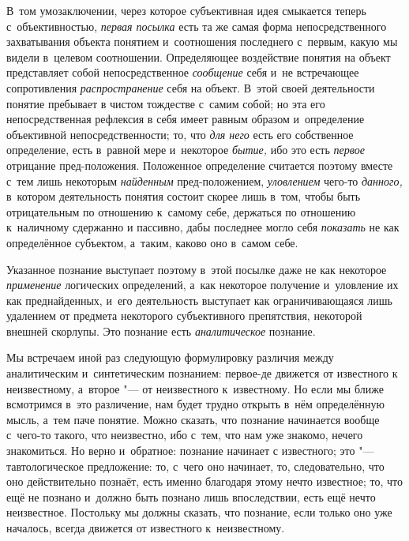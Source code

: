 В~том умозаключении, через которое субъективная идея смыкается
теперь с~объективностью, {\em первая
посылка} есть та же самая форма непосредственного
захватывания объекта понятием и~соотношения последнего с~первым, какую мы
видели в~целевом соотношении. Определяющее воздействие понятия на объект
представляет собой непосредственное
{\em сообщение} себя и~не
встречающее сопротивления
{\em распространение}
себя на объект. В~этой своей деятельности понятие пребывает в
чистом тождестве с~самим собой; но эта его непосредственная рефлексия в
себя имеет равным образом и~определение объективной непосредственности; то,
что {\em для него} есть
его собственное определение, есть в~равной мере и~некоторое
{\em бытие,} ибо это есть
{\em первое} отрицание
пред-положения. Положенное определение считается поэтому вместе
с~тем лишь некоторым {\em найденным}
пред-положением,
{\em уловлением} чего-то
{\em данного,} в~котором
деятельность понятия состоит скорее лишь в~том, чтобы быть отрицательным по
отношению к~самому себе, держаться по отношению к~наличному сдержанно и
пассивно, дабы последнее могло себя
{\em показать} не как
определённое субъектом, а~таким, каково оно в~самом себе.

Указанное познание выступает поэтому в~этой посылке даже не
как некоторое {\em применение}
логических определений, а~как некоторое получение и~уловление
их как преднайденных, и~его деятельность выступает как ограничивающаяся
лишь удалением от предмета некоторого субъективного препятствия, некоторой
внешней скорлупы. Это познание есть
{\em аналитическое}
познание.


Мы встречаем иной раз следующую формулировку различия между
аналитическим и~синтетическим познанием: первое-де движется от известного к
неизвестному, а~второе "--- от неизвестного к~известному. Но
если мы ближе всмотримся в~это различение, нам будет трудно открыть в~нём
определённую мысль, а~тем паче понятие. Можно сказать, что познание
начинается вообще с~чего-то такого, что неизвестно, ибо с~тем, что нам уже
знакомо, нечего знакомиться. Но верно и~обратное: познание начинает с
известного; это "--- тавтологическое предложение: то, с~чего
оно начинает, то, следовательно, что оно действительно познаёт, есть именно
благодаря этому нечто известное; то, что ещё не познано и~должно быть
познано лишь впоследствии, есть ещё нечто неизвестное. Постольку мы
должны сказать, что познание, если только оно уже началось,
всегда движется от известного к~неизвестному.

